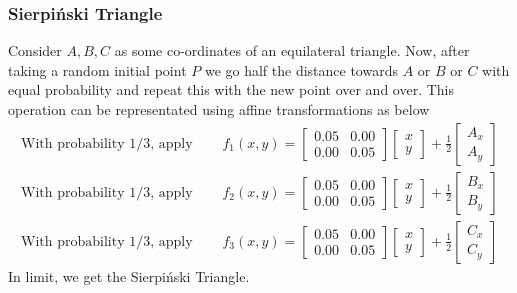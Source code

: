 \subsubsection{Sierpi\'nski Triangle}{\label{pp:sierpinskitriangle}}
Consider $A,B,C$ as some co-ordinates of an equilateral triangle. Now, after taking a random initial point $P$ we go half the distance towards $A$ or $B$ or $C$ with equal probability and repeat this with the new point over and over. This operation can be representated using affine transformations as below
\begin{align}
	\text{With probability 1/3, apply }& \quad f_{1}(x,y) = {\begin{bmatrix}0.05&0.00\\0.00&0.05\end{bmatrix}}{\begin{bmatrix}x\\y\end{bmatrix}}+\frac{1}{2}{\begin{bmatrix}A_x \\ A_y \end{bmatrix}}\\
	\text{With probability 1/3, apply }& \quad f_{2}(x,y) = {\begin{bmatrix}0.05&0.00\\0.00&0.05\end{bmatrix}}{\begin{bmatrix}x\\y\end{bmatrix}}+\frac{1}{2}{\begin{bmatrix}B_x \\ B_y \end{bmatrix}}\\
	\text{With probability 1/3, apply }& \quad f_{3}(x,y) = {\begin{bmatrix}0.05&0.00\\0.00&0.05\end{bmatrix}}{\begin{bmatrix}x\\y\end{bmatrix}}+\frac{1}{2}{\begin{bmatrix}C_x \\ C_y \end{bmatrix}}
\end{align}
In limit, we get the Sierpi\'nski Triangle.

